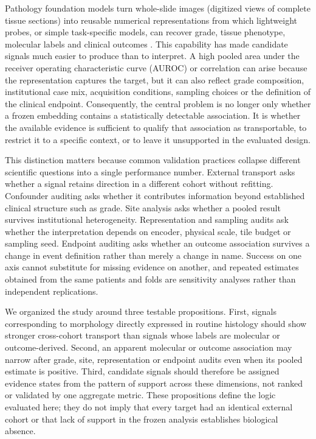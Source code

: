 Pathology foundation models turn whole-slide images (digitized views of complete tissue
sections) into reusable numerical representations from which lightweight probes, or
simple task-specific models, can recover grade, tissue phenotype, molecular labels and
clinical outcomes \cite{conch2023,virchow2023}. This capability has made candidate signals
much easier to produce than to interpret. A high pooled area under the receiver operating
characteristic curve (AUROC) or correlation can arise
because the representation captures the target, but it can also reflect grade composition,
institutional case mix, acquisition conditions, sampling choices or the definition of the
clinical endpoint. Consequently, the central problem is no longer only whether a frozen
embedding contains a statistically detectable association. It is whether the available
evidence is sufficient to qualify that association as transportable, to restrict it to a
specific context, or to leave it unsupported in the evaluated design.

This distinction matters because common validation practices collapse different scientific
questions into a single performance number. External transport asks whether a signal
retains direction in a different cohort without refitting. Confounder auditing asks whether
it contributes information beyond established clinical structure such as grade. Site
analysis asks whether a pooled result survives institutional heterogeneity. Representation
and sampling audits ask whether the interpretation depends on encoder, physical scale,
tile budget or sampling seed. Endpoint auditing asks whether an outcome association
survives a change in event definition rather than merely a change in name. Success on one
axis cannot substitute for missing evidence on another, and repeated estimates obtained
from the same patients and folds are sensitivity analyses rather than independent
replications.

We organized the study around three testable propositions. First, signals corresponding to
morphology directly expressed in routine histology should show stronger cross-cohort
transport than signals whose labels are molecular or outcome-derived. Second, an apparent
molecular or outcome association may narrow after grade, site, representation or endpoint
audits even when its pooled estimate is positive. Third, candidate signals should therefore
be assigned evidence states from the pattern of support across these dimensions, not ranked
or validated by one aggregate metric. These propositions define the logic evaluated here;
they do not imply that every target had an identical external cohort or that lack of support
in the frozen analysis establishes biological absence.

